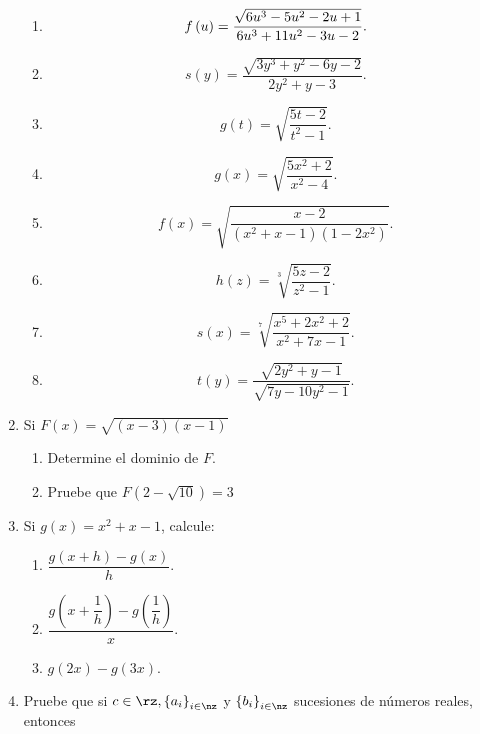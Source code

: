 \begin{enumerate}
\begin{enumerate}
\item
\[
f\left(  u\right)  =\dfrac{\sqrt{\allowbreak6u^{3}-5u^{2}-2u+1}}%
{\allowbreak6u^{3}+11u^{2}-3u-2}.
\]


\item
\[
s\left(  y\right)  =\dfrac{\sqrt{3y^{3}+y^{2}-6y-2}}{2y^{2}+y-3}.
\]


\item
\[
g\left(  t\right)  =\sqrt{\dfrac{5t-2}{t^{2}-1}}.
\]


\item
\[
g\left(  x\right)  =\sqrt{\dfrac{5x^{2}+2}{x^{2}-4}}.
\]


\item
\[
f\left(  x\right)  =\sqrt{\dfrac{x-2}{\left(  x^{2}+x-1\right)  \left(
1-2x^{2}\right)  }}.
\]


\item
\[
h\left(  z\right)  =\sqrt[3]{\dfrac{5z-2}{z^{2}-1}}.
\]


\item
\[
s\left(  x\right)  =\sqrt[7]{\dfrac{x^{5}+2x^{2}+2}{x^{2}+7x-1}}.
\]


\item
\[
t\left(  y\right)  =\dfrac{\sqrt{2y^{2}+y-1}}{\sqrt{7y-10y^{2}-1}}.
\]

\end{enumerate}

\item Si $F(x)=\sqrt{(x-3)(x-1)}$

\begin{enumerate}
\item Determine el dominio de $F$.

\item Pruebe que $F(2-\sqrt{10})=3$
\end{enumerate}

\item Si $g\left(  x\right)  =x^{2}+x-1$, calcule:

\begin{enumerate}
\item $\dfrac{g\left(  x+h\right)  -g\left(  x\right)  }{h}.$

\item $\dfrac{g\left(  x+\dfrac{1}{h}\right)  -g\left(  \dfrac{1}{h}\right)
}{x}.$

\item $g\left(  2x\right)  -g\left(  3x\right)  .$
\end{enumerate}

\item Pruebe que si $c\in\rz,\left\{  a_{i}\right\}  _{i\in\nz}$ y $\left\{
b_{i}\right\}  _{i\in\nz}$ sucesiones de n\'{u}meros reales, entonces


\end{enumerate}

